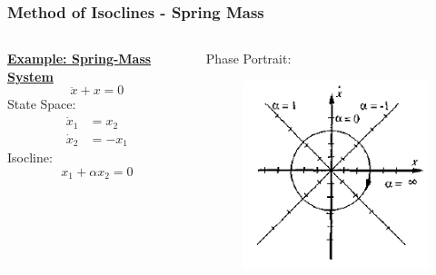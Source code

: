 \documentclass[11pt,handout]{beamer}   %
\begin{document}
\begin{frame}
\frametitle{Method of Isoclines - Spring Mass}
\begin{columns}
\begin{column}{0.5\textwidth}
\underline{\textbf{Example: Spring-Mass System}}
\begin{equation*}
\ddot{x} + x = 0
\end{equation*}
State Space:
\begin{equation*}
\begin{aligned}
\dot{x}_1 &= x_2\\
\dot{x}_2 &= -x_1
\end{aligned}
\end{equation*}
Isocline:
\begin{equation*}
x_1 + \alpha x_2 = 0
\end{equation*}
\end{column}
\begin{column}{0.5\textwidth}
Phase Portrait:
\begin{figure}
\centering
\includegraphics[width=\textwidth]{Figures/Isocline_1.PNG}
\end{figure}
\end{column}
\end{columns}
\end{frame}
\end{document}
